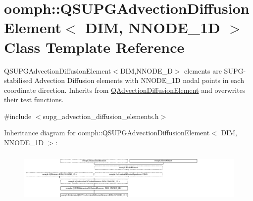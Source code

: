 \hypertarget{classoomph_1_1QSUPGAdvectionDiffusionElement}{}\section{oomph\+:\+:Q\+S\+U\+P\+G\+Advection\+Diffusion\+Element$<$ D\+IM, N\+N\+O\+D\+E\+\_\+1D $>$ Class Template Reference}
\label{classoomph_1_1QSUPGAdvectionDiffusionElement}


Q\+S\+U\+P\+G\+Advection\+Diffusion\+Element$<$\+D\+I\+M,\+N\+N\+O\+D\+E\+\_\+D$>$ elements are S\+U\+P\+G-\/stabilised Advection Diffusion elements with N\+N\+O\+D\+E\+\_\+1D nodal points in each coordinate direction. Inherits from \hyperlink{classoomph_1_1QAdvectionDiffusionElement}{Q\+Advection\+Diffusion\+Element} and overwrites their test functions.  




{\ttfamily \#include $<$supg\+\_\+advection\+\_\+diffusion\+\_\+elements.\+h$>$}

Inheritance diagram for oomph\+:\+:Q\+S\+U\+P\+G\+Advection\+Diffusion\+Element$<$ D\+IM, N\+N\+O\+D\+E\+\_\+1D $>$\+:\begin{figure}[H]
\begin{center}
\leavevmode
\includegraphics[height=2.539682cm]{classoomph_1_1QSUPGAdvectionDiffusionElement}
\end{center}
\end{figure}
